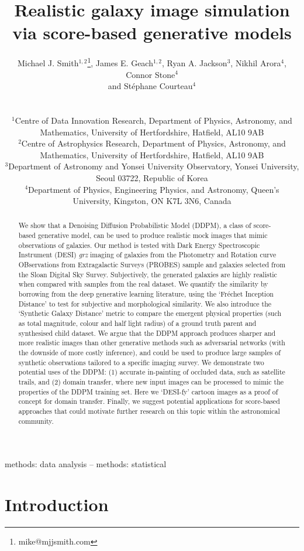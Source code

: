 \documentclass[fleqn,usenatbib]{mnras}
\title[Score-based modelling]{Realistic galaxy image simulation via score-based generative models}
\author[M. J. Smith et al.]
{\parbox{\textwidth}{
Michael J. Smith$^{1, 2}$\thanks{mike@mjjsmith.com},
James E. Geach$^{1, 2}$,
Ryan A. Jackson$^{3}$,
Nikhil Arora$^{4}$,
Connor Stone$^{4}$ \\ and
St\'ephane Courteau${^4}$}\\\\
$^{1}$Centre of Data Innovation Research, Department of Physics, Astronomy, and Mathematics, University of Hertfordshire, Hatfield, AL10 9AB\\
$^{2}$Centre of Astrophysics Research, Department of Physics, Astronomy, and Mathematics, University of Hertfordshire, Hatfield, AL10 9AB\\
$^{3}$Department of Astronomy and Yonsei University Observatory, Yonsei University, Seoul 03722, Republic of Korea\\
$^{4}$Department of Physics, Engineering Physics, and Astronomy, Queen’s University, Kingston, ON K7L 3N6, Canada
}
\begin{document}
\label{firstpage}
\pagerange{\pageref{firstpage}--\pageref{lastpage}}
\maketitle

\begin{abstract}
    We show that a Denoising Diffusion Probabilistic Model (DDPM), a class of
    score-based generative model, can be used to produce realistic mock
    images that mimic observations of galaxies. Our method is tested with Dark
    Energy Spectroscopic Instrument (DESI) {\it grz} imaging of galaxies from the
    Photometry and Rotation curve OBservations from Extragalactic Surveys
    (PROBES) sample and galaxies selected from the Sloan Digital Sky Survey.
    Subjectively, the generated galaxies are highly realistic when compared
    with samples from the real dataset. We quantify the similarity by
    borrowing from the deep generative learning literature, using the
    `Fr\'{e}chet Inception Distance' to test for subjective and morphological
    similarity. We also introduce the `Synthetic Galaxy Distance' metric
    to compare the emergent physical properties (such as total magnitude,
    colour and half light radius) of a ground truth parent and synthesised
    child dataset. We argue that the DDPM approach produces sharper and more
    realistic images than other generative methods such as adversarial networks
    (with the downside of more costly inference), and could be used to produce
    large samples of synthetic observations tailored to a specific imaging
    survey. We demonstrate two potential uses of the DDPM: (1) accurate
    in-painting of occluded data, such as satellite trails, and (2) domain
    transfer, where new input images can be processed to mimic the properties
    of the DDPM training set.  Here we `DESI-fy' cartoon images as a proof of
    concept for domain transfer.  Finally, we suggest potential applications
    for score-based approaches that could motivate further research on this
    topic within the astronomical community.
\end{abstract}

\begin{keywords}
    methods: data analysis -- methods: statistical
\end{keywords}





\section{Introduction}
\end{document}
